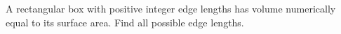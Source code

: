 A rectangular box with positive integer edge lengths has volume numerically equal to its surface area. Find all possible edge lengths.
